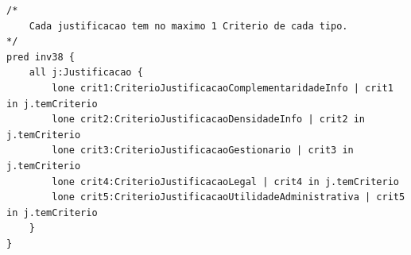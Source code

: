 \documentclass[tikz,runningheads,a4paper]{llncs}
\begin{document}
\begin{subappendices}
\begin{lstlisting}[language=alloy, frame=single]
/*
	Cada justificacao tem no maximo 1 Criterio de cada tipo.
*/
pred inv38 {
	all j:Justificacao {
		lone crit1:CriterioJustificacaoComplementaridadeInfo | crit1 in j.temCriterio
  		lone crit2:CriterioJustificacaoDensidadeInfo | crit2 in j.temCriterio
  		lone crit3:CriterioJustificacaoGestionario | crit3 in j.temCriterio
  		lone crit4:CriterioJustificacaoLegal | crit4 in j.temCriterio
  		lone crit5:CriterioJustificacaoUtilidadeAdministrativa | crit5 in j.temCriterio
	}
}
\end{lstlisting}{}

\end{subappendices}
\end{document}
